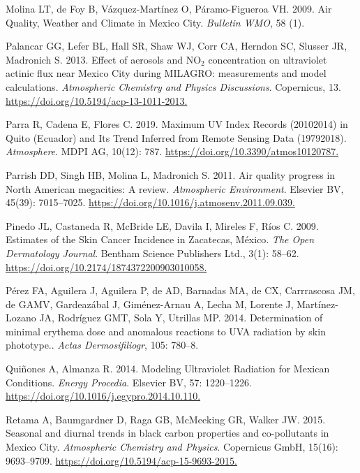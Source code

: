 \documentclass[10pt]{article}
\begin{document}
\label{csl:67}Molina LT, de Foy B, Vázquez-Martínez O, Páramo-Figueroa VH. 2009. {Air Quality, Weather and Climate in Mexico City}. \textit{Bulletin WMO}, 58 (1).

\label{csl:13}Palancar GG, Lefer BL, Hall SR, Shaw WJ, Corr CA, Herndon SC, Slusser JR, Madronich S. 2013. {Effect of aerosols and NO$_2$ concentration on ultraviolet actinic flux near Mexico City during MILAGRO: measurements and model calculations}. \textit{Atmospheric Chemistry and Physics Discussions}. Copernicus, 13. \url{https://doi.org/10.5194/acp-13-1011-2013.}

\label{csl:63}Parra R, Cadena E, Flores C. 2019. {Maximum {UV} Index Records (2010{\textendash}2014) in Quito (Ecuador) and Its Trend Inferred from Remote Sensing Data (1979{\textendash}2018)}. \textit{Atmosphere}. {MDPI} {AG}, 10(12): 787. \url{https://doi.org/10.3390/atmos10120787.}

\label{csl:0}Parrish DD, Singh HB, Molina L, Madronich S. 2011. {Air quality progress in North American megacities: A review}. \textit{Atmospheric Environment}. Elsevier {BV}, 45(39): 7015–7025. \url{https://doi.org/10.1016/j.atmosenv.2011.09.039.}

\label{csl:73}Pinedo JL, Castaneda R, McBride LE, Davila I, Mireles F, Ríos C. 2009. {Estimates of the Skin Cancer Incidence in Zacatecas, México}. \textit{The Open Dermatology Journal}. Bentham Science Publishers Ltd., 3(1): 58–62. \url{https://doi.org/10.2174/1874372200903010058.}

\label{csl:31}Pérez FA, Aguilera J, Aguilera P, de AD, Barnadas MA, de CX, Carrrascosa JM, de GAMV, Gardeazábal J, Giménez-Arnau A, Lecha M, Lorente J, Martínez-Lozano JA, Rodríguez GMT, Sola Y, Utrillas MP. 2014. {Determination of minimal erythema dose and anomalous reactions to UVA radiation by skin phototype.}. \textit{Actas Dermosifiliogr}, 105: 780–8.

\label{csl:16}Qui{\~{n}}ones A, Almanza R. 2014. {Modeling Ultraviolet Radiation for Mexican Conditions}. \textit{Energy Procedia}. Elsevier {BV}, 57: 1220–1226. \url{https://doi.org/10.1016/j.egypro.2014.10.110.}

\label{csl:66}Retama A, Baumgardner D, Raga GB, McMeeking GR, Walker JW. 2015. {Seasonal and diurnal trends in black carbon properties and co-pollutants in Mexico City}. \textit{Atmospheric Chemistry and Physics}. Copernicus {GmbH}, 15(16): 9693–9709. \url{https://doi.org/10.5194/acp-15-9693-2015.}
\end{document}
